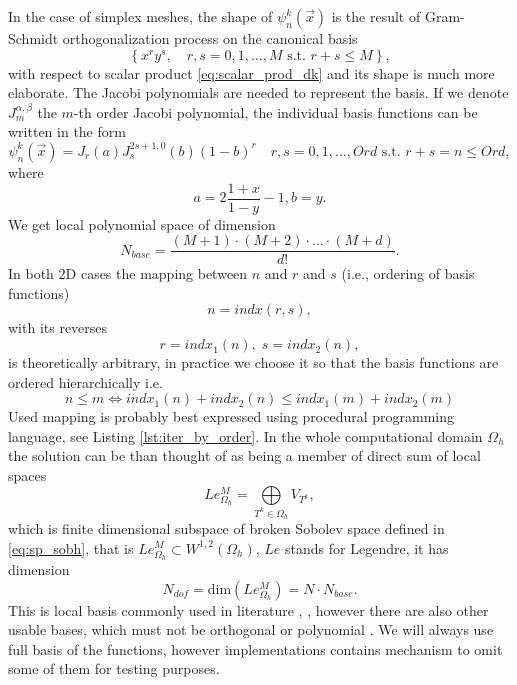 In the case of simplex meshes, the shape of $\psi_n^k(\vec{x})$ is the result of 
Gram-Schmidt orthogonalization process on the canonical basis 
\begin{equation}
    \label{eq:tens_canon}
    \left\{ x^ry^s,  \quad r, s = 0,1, \dots, M \text{ s.t. } r + s \leq M\right\},
\end{equation}
with respect to scalar product \eqref{eq:scalar_prod_dk}
and its shape is much more elaborate. The Jacobi polynomials are needed to 
represent the basis. If we denote $J^{\alpha, \beta}_m$ the $m$-th order 
Jacobi polynomial, the individual basis functions can be written in the form 
\cite{Hesthaven2008}
\begin{equation}
\psi_n^k(\vec{x}) = J_r(a)J^{2s+1, 0}_s(b)(1 - b)^r\quad r, s = 0,1, \dots, 
Ord \text{ s.t. } r + s = n \leq Ord,
\end{equation}
where
\begin{equation}
a = 2 \frac{1 + x}{1 - y} - 1, b = y.
\end{equation}
We get local polynomial space of dimension
\begin{equation}
N_{base} =  \frac{(M + 1) \cdot (M + 2) \cdot ... \cdot (M + d)}{d!}.
\end{equation}
In both 2D cases the mapping between $n$ and $r$ and $s$ (i.e., ordering of 
basis functions) 
\begin{equation}
\label{eq:bindx}
n = indx(r, s),
\end{equation}
with its reverses
\begin{equation}
r = indx_1(n),\; s = indx_2(n),
\end{equation}
is theoretically arbitrary, in practice we choose it so that the basis 
functions are ordered hierarchically i.e.
\begin{equation}
n \leq m \Leftrightarrow indx_1(n) + indx_2(n) \leq indx_1(m) + indx_2(m)
\end{equation}
Used mapping is probably best expressed using procedural programming language,
see Listing \ref{lst:iter_by_order}.
In the whole computational domain $\Omega_h$ the solution can be than thought 
of as being a member of direct sum of local spaces
\begin{equation}
Le_{\Omega_h}^{M} = \bigoplus\limits_{T^k \in \Omega_h} V_{T^k},
\end{equation}
which is finite dimensional subspace of broken Sobolev space defined in 
\eqref{eq:sp_sobh}, 
that is $Le_{\Omega_h}^{M} \subset  W^{1,2}(\Omega_h)$, $Le$ stands for Legendre, it has 
dimension
\begin{equation}
\label{eq:dim_legh}
N_{dof} = \text{dim}(Le_{\Omega_h}^{M}) = N\cdot N_{base}.
\end{equation}
This is local basis commonly used in literature \cite{Hesthaven2008}, 
\cite{Bokhove2008}, however there are also other usable bases, which must not 
be orthogonal or polynomial \cite{Yuan2006}. We will always use full 
basis of the functions, however implementations contains mechanism to omit 
some of them for testing purposes.

